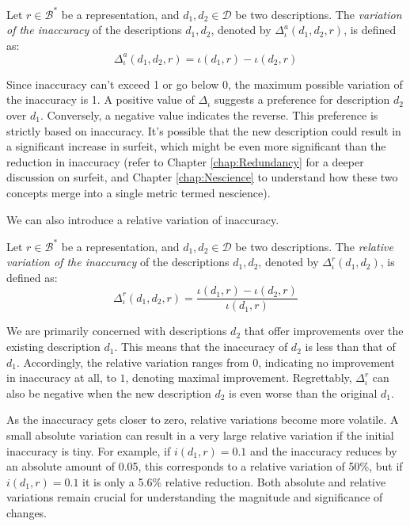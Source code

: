 \begin{definition}
Let $r \in \mathcal{B}^\ast$ be a representation, and $d_1, d_2 \in \mathcal{D}$ be two descriptions. The \emph{variation of the inaccuracy} of the descriptions $d_1, d_2$, denoted by $\Delta^{a} _{\iota} ( d_1, d_2, r )$, is defined as:
\[
\Delta^{a}_{\iota} ( d_1, d_2, r ) = \iota(d_1, r) - \iota(d_2, r)
\] 
\end{definition}

Since inaccuracy can't exceed 1 or go below 0, the maximum possible variation of the inaccuracy is 1. A positive value of $\Delta_{\iota}$ suggests a preference for description $d_2$ over $d_1$. Conversely, a negative value indicates the reverse. This preference is strictly based on inaccuracy. It's possible that the new description could result in a significant increase in surfeit, which might be even more significant than the reduction in inaccuracy (refer to Chapter \ref{chap:Redundancy} for a deeper discussion on surfeit, and Chapter \ref{chap:Nescience} to understand how these two concepts merge into a single metric termed nescience).

We can also introduce a relative variation of inaccuracy.

\begin{definition}
Let $r \in \mathcal{B}^\ast$ be a representation, and $d_1, d_2 \in \mathcal{D}$ be two descriptions. The \emph{relative variation of the inaccuracy} of the descriptions $d_1, d_2$, denoted by $\Delta^{r}_{\iota} ( d_1, d_2 )$, is defined as:
\[
\Delta^{r}_{\iota} ( d_1, d_2, r ) = \frac{\iota(d_1, r) - \iota(d_2, r)}{\iota(d_1, r)}
\] 
\end{definition}

We are primarily concerned with descriptions $d_2$ that offer improvements over the existing description $d_1$. This means that the inaccuracy of $d_2$ is less than that of $d_1$. Accordingly, the relative variation ranges from $0$, indicating no improvement in inaccuracy at all, to $1$, denoting maximal improvement. Regrettably, $\Delta^{r}_{\iota}$ can also be negative when the new description $d_2$ is even worse than the original $d_1$.

As the inaccuracy gets closer to zero, relative variations become more volatile. A small absolute variation can result in a very large relative variation if the initial inaccuracy is tiny. For example, if $i(d_1, r) = 0.1$ and the inaccuracy reduces by an absolute amount of 0.05, this corresponds to a relative variation of 50\%, but if $i(d_1, r) = 0.1$ it is only a 5.6\% relative reduction. Both absolute and relative variations remain crucial for understanding the magnitude and significance of changes.

